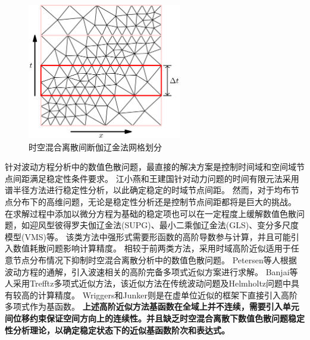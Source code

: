 \newpage

\begin{figure}[!h]
    \centering 
    \includegraphics[width=0.6\textwidth]{figures/wave_slab_2D.png}
    \caption{时空混合离散间断伽辽金法网格划分}
    \label{fg:slab}
\end{figure}

针对波动方程分析中的数值色散问题，最直接的解决方案是控制时间域和空间域节点间距满足稳定性条件要求\cite{bajer1986}。
江小燕和王建国\cite{JiangXiaoYan2014}针对动力问题的时间有限元法采用谱半径方法进行稳定性分析，以此确定稳定的时域节点间距。
然而，对于均布节点分布下的高维问题，无论是稳定性分析还是控制节点间距都将是巨大的挑战。
在求解过程中添加以微分方程为基础的稳定项也可以在一定程度上缓解数值色散问题，如迎风型彼得罗夫伽辽金法(SUPG)\cite{hughes1988}、最小二乘伽辽金法(GLS)\cite{hughes2000}、变分多尺度模型(VMS)\cite{hughes1996}等。
该类方法中强形式需要形函数的高阶导数参与计算，并且可能引入数值耗散问题影响计算精度。
相较于前两类方法，采用时域高阶近似适用于任意节点分布情况下抑制时空混合离散分析中的数值色散问题。
Petersen等人\cite{petersen2000}根据波动方程的通解，引入波速相关的高阶完备多项式近似方案进行求解。
Banjai等人\cite{banjai2017}采用Trefftz多项式近似方法，该近似方法在传统波动问题及Helmholtz问题中具有较高的计算精度。
Wriggers和Junker\cite{wriggers2024}则是在虚单位近似的框架下直接引入高阶多项式作为基函数。
\textbf{上述高阶近似方法基函数在全域上并不连续，需要引入单元间位移约束保证空间方向上的连续性。并且缺乏时空混合离散下数值色散问题稳定性分析理论，以确定稳定状态下的近似基函数阶次和表达式。}

